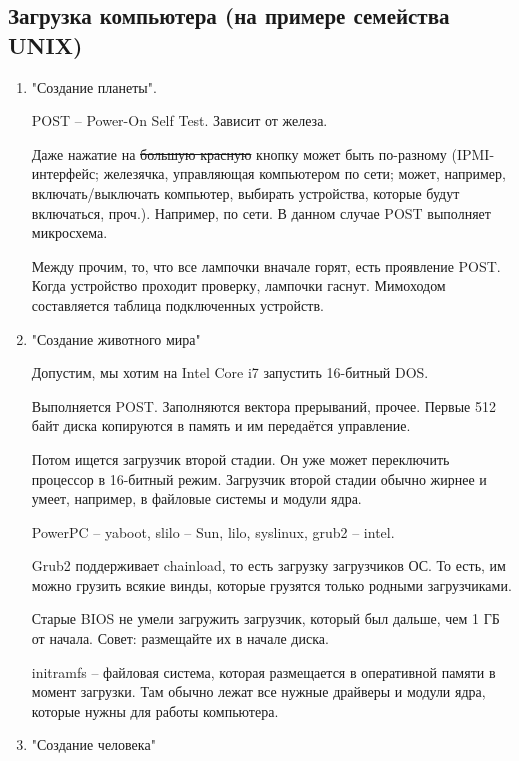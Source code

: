 \documentclass[a4paper,10pt]{article}
\begin{document}
\subsection{Загрузка компьютера (на примере семейства UNIX)}
\begin{enumerate}
\item "Создание планеты".

POST -- Power-On Self Test. Зависит от железа.

Даже нажатие на \sout{большую красную} кнопку может быть по-разному (IPMI-интерфейс; железячка, управляющая компьютером по сети; может, например, включать/выключать компьютер, выбирать устройства, которые будут включаться, проч.). Например, по сети.
В данном случае POST выполняет микросхема.

Между прочим, то, что все лампочки вначале горят, есть проявление POST. Когда устройство проходит проверку, лампочки гаснут. Мимоходом составляется таблица подключенных устройств.

\item "Создание животного мира"

Допустим, мы хотим на Intel Core i7 запустить 16-битный DOS.

Выполняется POST. Заполняются вектора прерываний, прочее. Первые 512 байт диска копируются в память и им передаётся управление. 

Потом ищется загрузчик второй стадии. Он уже может переключить процессор в 16-битный режим. Загрузчик второй стадии обычно жирнее и умеет, например, в файловые системы и модули ядра.

PowerPC -- yaboot, slilo -- Sun, lilo, syslinux, grub2 -- intel.

Grub2 поддерживает chainload, то есть загрузку загрузчиков ОС. То есть, им можно грузить всякие винды, которые грузятся только родными загрузчиками.

Старые BIOS не умели загружить загрузчик, который был дальше, чем 1 ГБ от начала. Совет: размещайте их в начале диска.

initramfs -- файловая система, которая размещается в оперативной памяти в момент загрузки. Там обычно лежат все нужные драйверы и модули ядра, которые нужны для работы компьютера.

\item "Создание человека"


\end{enumerate}
\end{document}
